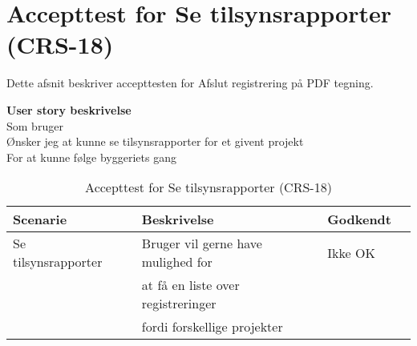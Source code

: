 \section{Accepttest for Se tilsynsrapporter (CRS-18)}
Dette afsnit beskriver accepttesten for Afslut registrering på PDF tegning.

\textbf{User story beskrivelse} \\
Som bruger \\
Ønsker jeg at kunne se tilsynsrapporter for et givent projekt \\
For at kunne følge byggeriets gang

\begin{table}[H]
	\centering
	\begin{tabular}{|ll|l|ll|} \hline
		\textbf{Scenarie} &  & \textbf{Beskrivelse}&  \textbf{Godkendt}&  \\ \hline
		Se tilsynsrapporter&  &  Bruger vil gerne have mulighed for &  Ikke OK&  \\
		& & at få en liste over registreringer & & \\
		& & fordi forskellige projekter& & \\ \hline
	\end{tabular}
	\caption{Accepttest for Se tilsynsrapporter (CRS-18)}
	\label{AcceptTilsyn}
\end{table}